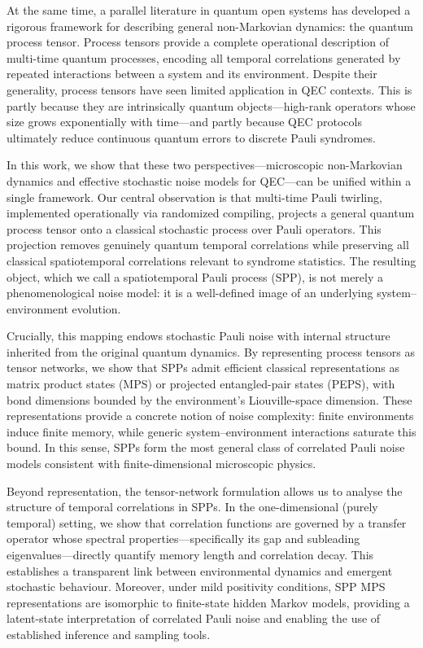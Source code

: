 \documentclass{article}
\begin{document}
At the same time, a parallel literature in quantum open systems has developed a rigorous framework for describing general non-Markovian dynamics: the quantum process tensor. Process tensors provide a complete operational description of multi-time quantum processes, encoding all temporal correlations generated by repeated interactions between a system and its environment. Despite their generality, process tensors have seen limited application in QEC contexts. This is partly because they are intrinsically quantum objects—high-rank operators whose size grows exponentially with time—and partly because QEC protocols ultimately reduce continuous quantum errors to discrete Pauli syndromes.

In this work, we show that these two perspectives—microscopic non-Markovian dynamics and effective stochastic noise models for QEC—can be unified within a single framework. Our central observation is that multi-time Pauli twirling, implemented operationally via randomized compiling, projects a general quantum process tensor onto a classical stochastic process over Pauli operators. This projection removes genuinely quantum temporal correlations while preserving all classical spatiotemporal correlations relevant to syndrome statistics. The resulting object, which we call a spatiotemporal Pauli process (SPP), is not merely a phenomenological noise model: it is a well-defined image of an underlying system–environment evolution.

Crucially, this mapping endows stochastic Pauli noise with internal structure inherited from the original quantum dynamics. By representing process tensors as tensor networks, we show that SPPs admit efficient classical representations as matrix product states (MPS) or projected entangled-pair states (PEPS), with bond dimensions bounded by the environment’s Liouville-space dimension. These representations provide a concrete notion of noise complexity: finite environments induce finite memory, while generic system–environment interactions saturate this bound. In this sense, SPPs form the most general class of correlated Pauli noise models consistent with finite-dimensional microscopic physics.

Beyond representation, the tensor-network formulation allows us to analyse the structure of temporal correlations in SPPs. In the one-dimensional (purely temporal) setting, we show that correlation functions are governed by a transfer operator whose spectral properties—specifically its gap and subleading eigenvalues—directly quantify memory length and correlation decay. This establishes a transparent link between environmental dynamics and emergent stochastic behaviour. Moreover, under mild positivity conditions, SPP MPS representations are isomorphic to finite-state hidden Markov models, providing a latent-state interpretation of correlated Pauli noise and enabling the use of established inference and sampling tools.
\end{document}
